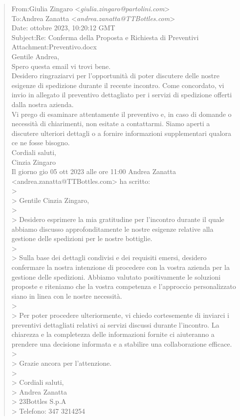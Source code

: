 \footnotesize
\begin{tcolorbox}[colback=gray!20, colframe=gray!50,sharp corners=southwest]
\begin{quote}
From:\qquad Giulia Zingaro <\textit{giulia.zingaro@partolini.com}>\\
To:\qquad Andrea Zanatta <\textit{andrea.zanatta@TTBottles.com}>\\
Date: ottobre 2023, 10:20:12 GMT\\
Subject:\qquad Re: Conferma della Proposta e Richiesta di Preventivi\\
Attachment:\qquad Preventivo.docx\vspace{14pt}\\
Gentile Andrea,\\
Spero questa email vi trovi bene.\\
Desidero ringraziarvi per l'opportunità di poter discutere delle nostre esigenze di spedizione durante il recente incontro. Come concordato, vi invio in allegato il preventivo dettagliato per i servizi di spedizione offerti dalla nostra azienda.\\
Vi prego di esaminare attentamente il preventivo e, in caso di domande o necessità di chiarimenti, non esitate a contattarmi. Siamo aperti a discutere ulteriori dettagli o a fornire informazioni supplementari qualora ce ne fosse bisogno.\\
Cordiali saluti,\\
Cinzia Zingaro\vspace{14pt}\\
Il giorno gio 05 ott 2023 alle ore 11:00 Andrea Zanatta <andrea.zanatta@TTBottles.com> ha scritto:\\
>\\
> Gentile Cinzia Zingaro,\\
>\\
> Desidero esprimere la mia gratitudine per l'incontro durante il quale abbiamo discusso approfonditamente le nostre esigenze relative alla gestione delle spedizioni per le nostre bottiglie.\\
>\\
> Sulla base dei dettagli condivisi e dei requisiti emersi, desidero confermare la nostra intenzione di procedere con la vostra azienda per la gestione delle spedizioni. Abbiamo valutato positivamente le soluzioni proposte e riteniamo che la vostra competenza e l'approccio personalizzato siano in linea con le nostre necessità.\\
>\\
> Per poter procedere ulteriormente, vi chiedo cortesemente di inviarci i preventivi dettagliati relativi ai servizi discussi durante l'incontro. La chiarezza e la completezza delle informazioni fornite ci aiuteranno a prendere una decisione informata e a stabilire una collaborazione efficace.\\
>\\
> Grazie ancora per l'attenzione.\\
>\\
> Cordiali saluti,\\
> Andrea Zanatta\\
> 23Bottles S.p.A\\
> Telefono: 347 3214254
\end{quote}
\end{tcolorbox}
